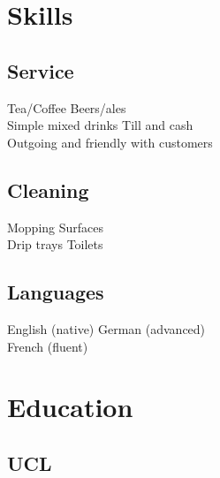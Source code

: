 \documentclass[a4paper,nomath]{deedy-resume} %
\begin{document}
\hfill
%
\begin{minipage}[t]{0.3\textwidth} %


    \section{Skills}
    
    \subsection{Service}

    Tea/Coffee \textbullet{} Beers/ales \\
    Simple mixed drinks \textbullet{} Till and cash \\
    Outgoing and friendly with customers

    \sectionspace %

    \subsection{Cleaning}

	Mopping \textbullet{} Surfaces \\
	Drip trays \textbullet{} Toilets 
	
	\sectionspace %

    \subsection{Languages}
    English (native) \textbullet{} German (advanced) \\
    French (fluent)


    \section{Education} 
    
    \subsection{UCL}
    

\end{minipage}
\end{document}
